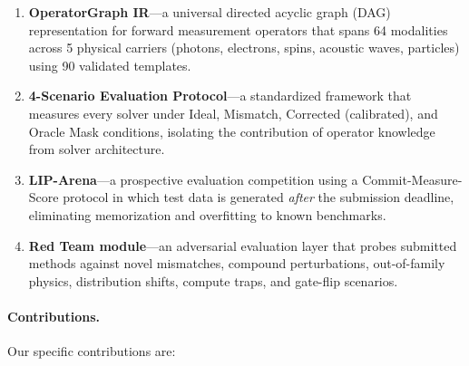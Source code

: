 \begin{enumerate}
  \item \textbf{OperatorGraph IR}---a universal directed acyclic graph
        (DAG) representation for forward measurement operators that
        spans 64 modalities across 5 physical carriers (photons,
        electrons, spins, acoustic waves, particles) using 90 validated
        templates.
  \item \textbf{4-Scenario Evaluation Protocol}---a standardized
        framework that measures every solver under Ideal, Mismatch,
        Corrected (calibrated), and Oracle Mask conditions,
        isolating the contribution of operator knowledge from solver
        architecture.
  \item \textbf{LIP-Arena}---a prospective evaluation competition using
        a Commit-Measure-Score protocol in which test data is generated
        \emph{after} the submission deadline, eliminating memorization
        and overfitting to known benchmarks.
  \item \textbf{Red Team module}---an adversarial evaluation layer that
        probes submitted methods against novel mismatches, compound
        perturbations, out-of-family physics, distribution shifts,
        compute traps, and gate-flip scenarios.
\end{enumerate}


\paragraph{Contributions.}
Our specific contributions are:

